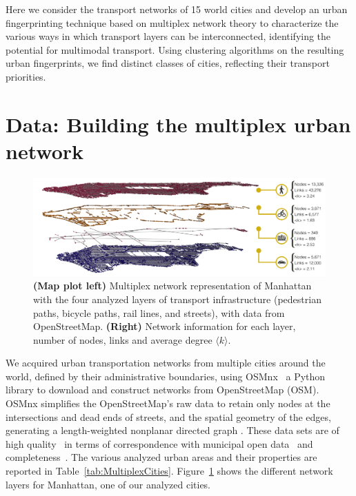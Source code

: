 Here we consider the transport networks of 15 world cities and develop an urban fingerprinting technique based on multiplex network theory to characterize the various ways in which transport layers can be interconnected, identifying the potential for multimodal transport. Using clustering algorithms on the resulting urban fingerprints, we find distinct classes of cities, reflecting their transport priorities.

\section{Data: Building the multiplex urban network}\label{sec:overlapData}

\begin{figure}[t!]
	\centering
	\includegraphics[width=\textwidth]{images/multiplex/Multilayer_NY_op2.png}
	\caption[Manhattan multiplex network]{\textbf{(Map plot left)} Multiplex network representation of Manhattan with the four analyzed layers of transport infrastructure (pedestrian paths, bicycle paths, rail lines, and streets), with data from OpenStreetMap. \textbf{(Right)} Network information for each layer, number of nodes, links and average degree $\langle k \rangle$.}
	\label{fig:ManhattanMultiplex}
\end{figure}


We acquired urban transportation networks from multiple cities around the world, defined by their administrative boundaries, using OSMnx~\cite{boeing2017osmnx} a Python library to download and construct networks from OpenStreetMap (OSM). OSMnx simplifies the OpenStreetMap's raw data to retain only nodes at the intersections and dead ends of streets, and the spatial geometry of the edges, generating a length-weighted nonplanar directed graph \cite{Boeing2020Planarity}. These data sets are of high quality~\cite{haklay2010openstreetmap,girres2010quality} in terms of correspondence with municipal open data~\cite{Ferster2019Bicycle} and completeness~\cite{barbosa2018human}. The various analyzed urban areas and their properties are reported in Table~\ref{tab:MultiplexCities}. Figure~\ref{fig:ManhattanMultiplex} shows the different network layers for Manhattan, one  of our analyzed cities.

